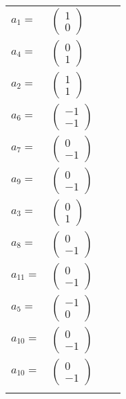 \documentclass[1p]{elsarticle_modified}
\theoremstyle{definition}
\begin{document}
\begin{tabular}{m{7pt} m{180pt} m{7pt} m{180pt} }
\flushright $a_{1}=$&$\begin{pmatrix}1\\0\end{pmatrix}$ \\
\flushright $a_{4}=$&$\begin{pmatrix}0\\1\end{pmatrix}$ \\
\flushright $a_{2}=$&$\begin{pmatrix}1\\1\end{pmatrix}$ \\
\flushright $a_{6}=$&$\begin{pmatrix}-1\\-1\end{pmatrix}$ \\
\flushright $a_{7}=$&$\begin{pmatrix}0\\-1\end{pmatrix}$ \\
\flushright $a_{9}=$&$\begin{pmatrix}0\\-1\end{pmatrix}$ \\
\flushright $a_{3}=$&$\begin{pmatrix}0\\1\end{pmatrix}$ \\
\flushright $a_{8}=$&$\begin{pmatrix}0\\-1\end{pmatrix}$ \\
\flushright $a_{11}=$&$\begin{pmatrix}0\\-1\end{pmatrix}$ \\
\flushright $a_{5}=$&$\begin{pmatrix}-1\\0\end{pmatrix}$ \\
\flushright $a_{10}=$&$\begin{pmatrix}0\\-1\end{pmatrix}$\\ \flushright $a_{10}=$&$\begin{pmatrix}0\\-1\end{pmatrix}$\\&\end{tabular}
\end{document}
